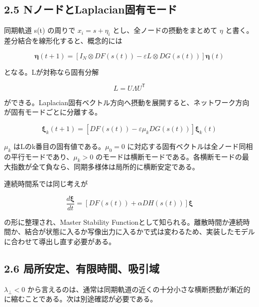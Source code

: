 \documentclass[11pt,a4paper]{ltjsarticle}
\begin{document}
\subsection*{\textcolor{researchblue}{2.5 NノードとLaplacian固有モード}}

同期軌道 s(t) の周りで \(x_i=s+\eta_i\) とし、全ノードの摂動をまとめて \(\eta\) と書く。差分結合を線形化すると、概念的には\par

\[
\boldsymbol{\eta}(t+1)=\left[I_N\otimes DF\!\left(s(t)\right)-\varepsilon L\otimes DG\!\left(s(t)\right)\right]\boldsymbol{\eta}(t)
\]

となる。Lが対称なら固有分解\par

\[
L=U\Lambda U^{\mathsf T}
\]

ができる。Laplacian固有ベクトル方向へ摂動を展開すると、ネットワーク方向が固有モードごとに分離する。\par

\[
\boldsymbol{\xi}_k(t+1)=\left[DF\!\left(s(t)\right)-\varepsilon\mu_k DG\!\left(s(t)\right)\right]\boldsymbol{\xi}_k(t)
\]

\(\mu_k\) はLのk番目の固有値である。\(\mu_0=0\) に対応する固有ベクトルは全ノード同相の平行モードであり、\(\mu_k>0\) のモードは横断モードである。各横断モードの最大指数が全て負なら、同期多様体は局所的に横断安定である。\par

連続時間系では同じ考えが\par

\[
\frac{d\boldsymbol{\xi}}{dt}=\left[DF\!\left(s(t)\right)+\alpha DH\!\left(s(t)\right)\right]\boldsymbol{\xi}
\]

の形に整理され、Master Stability Functionとして知られる。離散時間か連続時間か、結合が状態に入るか写像出力に入るかで式は変わるため、実装したモデルに合わせて導出し直す必要がある。\par

\subsection*{\textcolor{researchblue}{2.6 局所安定、有限時間、吸引域}}

\(\lambda_{\perp}<0\) から言えるのは、通常は同期軌道の近くの十分小さな横断摂動が漸近的に縮むことである。次は別途確認が必要である。\par
\end{document}
